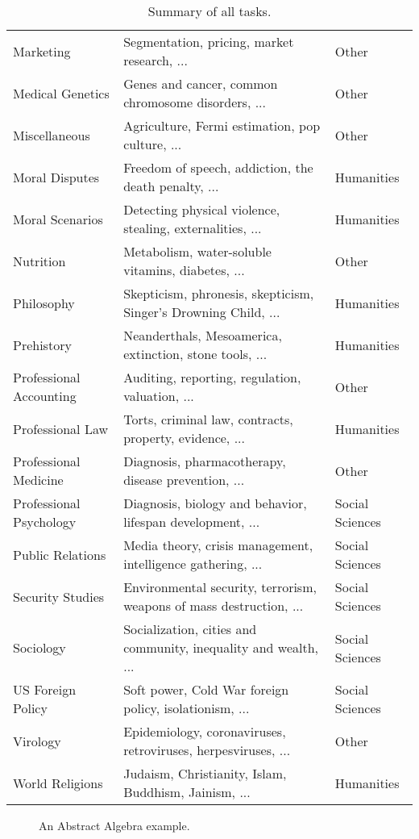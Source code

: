 \documentclass{article} \usepackage{iclr2021_conference, times}
\begin{document}
\begin{table}[h]
{\begin{tabular}{lll}
Marketing & Segmentation, pricing, market research, ... & Other \\
Medical Genetics & Genes and cancer, common chromosome disorders, ... & Other \\
Miscellaneous & Agriculture, Fermi estimation, pop culture, ... & Other \\
Moral Disputes & Freedom of speech, addiction, the death penalty, ... & Humanities \\
Moral Scenarios & Detecting physical violence, stealing, externalities, ... & Humanities \\
Nutrition & Metabolism, water-soluble vitamins, diabetes, ... & Other \\
Philosophy & Skepticism, phronesis, skepticism, Singer's Drowning Child, ... & Humanities \\
Prehistory & Neanderthals, Mesoamerica, extinction, stone tools, ... & Humanities \\
Professional Accounting & Auditing, reporting, regulation, valuation, ... & Other \\
Professional Law &  Torts, criminal law, contracts, property, evidence, ... & Humanities \\
Professional Medicine & Diagnosis, pharmacotherapy, disease prevention, ... & Other \\
Professional Psychology & Diagnosis, biology and behavior, lifespan development, ... & Social Sciences \\
Public Relations & Media theory, crisis management, intelligence gathering, ... & Social Sciences \\
Security Studies & Environmental security, terrorism, weapons of mass destruction, ... & Social Sciences \\
Sociology & Socialization, cities and community, inequality and wealth, ... & Social Sciences \\
US Foreign Policy & Soft power, Cold War foreign policy, isolationism, ... & Social Sciences \\
Virology & Epidemiology, coronaviruses, retroviruses, herpesviruses, ... & Other \\
World Religions & Judaism, Christianity, Islam, Buddhism, Jainism, ... & Humanities\\
\hline
\end{tabular}}
\caption{Summary of all  tasks.}
\label{tab:datasetdescriptions}
\end{table}


\clearpage
\begin{figure}
\centering
{}
    \caption{An Abstract Algebra example.}
    \label{fig:abstractalgebraexample}
\end{figure}
\end{document}
